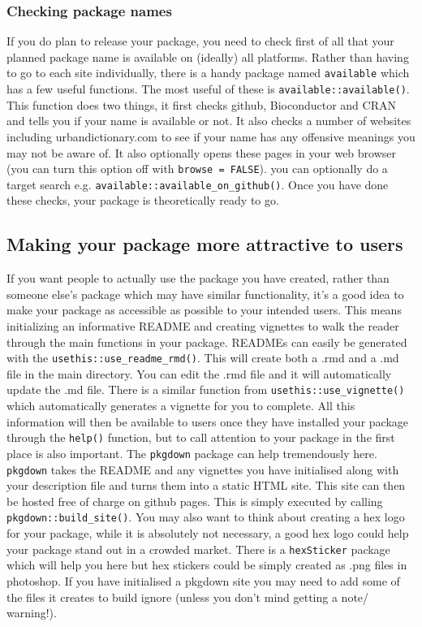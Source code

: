 \documentclass[a4paper,11pt]{article}
\begin{document}
\subsubsection{Checking package names}
If you do plan to release your package, you need to check first of all that your planned package name is available on (ideally) all platforms. Rather than having to go to each site individually, there is a handy package named \texttt{available} \cite{available} which has a few useful functions. The most useful of these is \texttt{available::available()}. This function does two things, it first checks github, Bioconductor and CRAN and tells you if your name is available or not. It also checks a number of websites including urbandictionary.com to see if your name has any offensive meanings you may not be aware of. It also optionally opens these pages in your web browser (you can turn this option off with \texttt{browse = FALSE}). you can optionally do a target search e.g. \texttt{available::available\_on\_github()}. Once you have done these checks, your package is theoretically ready to go.

\subsection{Making your package more attractive to users}
If you want people to actually use the package you have created, rather than someone else's package which may have similar functionality, it's a good idea to make your package as accessible as possible to your intended users. This means initializing an informative README and creating vignettes to walk the reader through the main functions in your package. READMEs can easily be generated with the \texttt{usethis::use\_readme\_rmd()}. This will create both a .rmd and a .md file in the main directory. You can edit the .rmd file and it will automatically update the .md file. There is a similar function from \texttt{usethis::use\_vignette()} which automatically generates a vignette for you to complete. All this information will then be available to users once they have installed your package through the \texttt{help()} function, but to call attention to your package in the first place is also important. The \texttt{pkgdown} package \cite{pkgdown} can help tremendously here. \texttt{pkgdown} takes the README and any vignettes you have initialised along with your description file and turns them into a static HTML site. This site can then be hosted free of charge on github pages. This is simply executed by calling \texttt{pkgdown::build\_site()}. You may also want to think about creating a hex logo for your package, while it is absolutely not necessary, a good hex logo could help your package stand out in a crowded market. There is a \texttt{hexSticker} package \cite{hexSticker} which will help you here but hex stickers could be simply created as .png files in photoshop. If you have initialised a pkgdown site you may need to add some of the files it creates to build ignore (unless you don't mind getting a note/ warning!).
\end{document}
